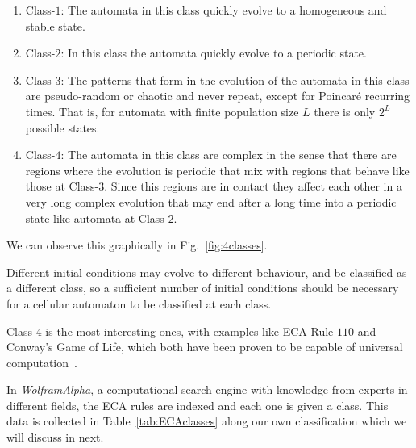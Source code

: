 \begin{enumerate}
    \item Class-$1$: The automata in this class quickly evolve to a homogeneous and stable state.
    \item Class-$2$: In this class the automata quickly evolve to a periodic state.
    \item Class-$3$: The patterns that form in the evolution of the automata in this class are pseudo-random or chaotic and never repeat, except for Poincaré recurring times. That is, for automata with finite population size $L$ there is only $2^L$ possible states.
    \item Class-$4$: The automata in this class are complex in the sense that there are regions where the evolution is periodic that mix with regions that behave like those at Class-$3$. Since this regions are in contact they affect each other in a very long complex evolution that may end after a long time into a periodic state like automata at Class-$2$. 
\end{enumerate}




We can observe this graphically in Fig.~\ref{fig:4classes}.

Different initial conditions may evolve to different behaviour, and be classified as a different class, so a sufficient number of initial conditions should be necessary for a cellular automaton to be classified at each class.

Class 4 is the most interesting ones, with examples like ECA Rule-$110$ and Conway's Game of Life, which both have been proven to be capable of universal computation~\cite{UniversalComputingECA110}. 


In \textit{WolframAlpha}, a computational search engine with knowlodge from experts in different fields, the ECA rules are indexed and each one is given a class. This data is collected in Table~\ref{tab:ECAclasses} along our own classification which we will discuss in next.










